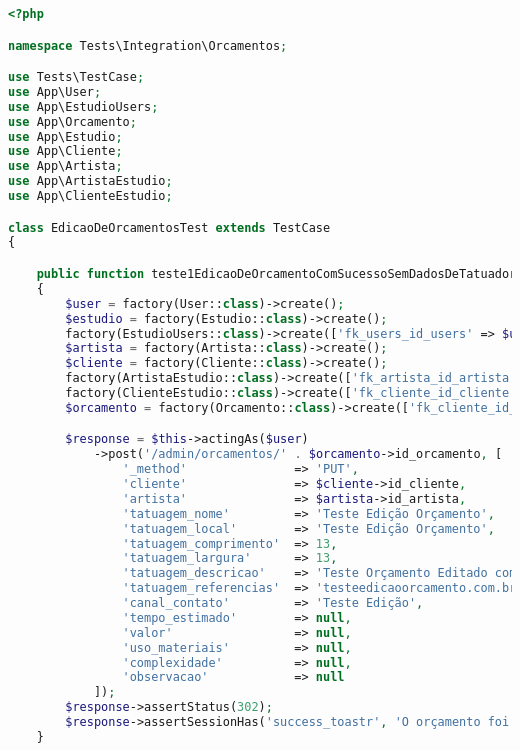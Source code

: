 \begin{lstlisting}[language=PHP, caption= Scripts de teste de Edição de Orçamentos, nolol,
label={code:EdicaoDeOrcamentoTest}]
<?php

namespace Tests\Integration\Orcamentos;

use Tests\TestCase;
use App\User;
use App\EstudioUsers;
use App\Orcamento;
use App\Estudio;
use App\Cliente;
use App\Artista;
use App\ArtistaEstudio;
use App\ClienteEstudio;

class EdicaoDeOrcamentosTest extends TestCase
{

    public function teste1EdicaoDeOrcamentoComSucessoSemDadosDeTatuador()
    {
        $user = factory(User::class)->create();
        $estudio = factory(Estudio::class)->create();
        factory(EstudioUsers::class)->create(['fk_users_id_users' => $user->id, 'fk_estudio_id_estudio' => $estudio->id_estudio]);
        $artista = factory(Artista::class)->create();
        $cliente = factory(Cliente::class)->create();
        factory(ArtistaEstudio::class)->create(['fk_artista_id_artista' => $artista->id_artista, 'fk_estudio_id_estudio' => $estudio->id_estudio]);
        factory(ClienteEstudio::class)->create(['fk_cliente_id_cliente' => $cliente->id_cliente, 'fk_estudio_id_estudio' => $estudio->id_estudio]);
        $orcamento = factory(Orcamento::class)->create(['fk_cliente_id_cliente' => $cliente->id_cliente, 'fk_artista_id_artista' => $artista->id_artista, 'fk_estudio_id_estudio' => $estudio->id_estudio, 'fk_orcamento_status_id_orcamento_status' => 1]);

        $response = $this->actingAs($user)
            ->post('/admin/orcamentos/' . $orcamento->id_orcamento, [
                '_method'               => 'PUT',
                'cliente'               => $cliente->id_cliente,
                'artista'               => $artista->id_artista,
                'tatuagem_nome'         => 'Teste Edição Orçamento',
                'tatuagem_local'        => 'Teste Edição Orçamento',
                'tatuagem_comprimento'  => 13,
                'tatuagem_largura'      => 13,
                'tatuagem_descricao'    => 'Teste Orçamento Editado com Sucesso!',
                'tatuagem_referencias'  => 'testeedicaoorcamento.com.br',
                'canal_contato'         => 'Teste Edição',
                'tempo_estimado'        => null,
                'valor'                 => null,
                'uso_materiais'         => null,
                'complexidade'          => null,
                'observacao'            => null
            ]);
        $response->assertStatus(302);
        $response->assertSessionHas('success_toastr', 'O orçamento foi atualizado com sucesso!');
    }


\end{lstlisting}
